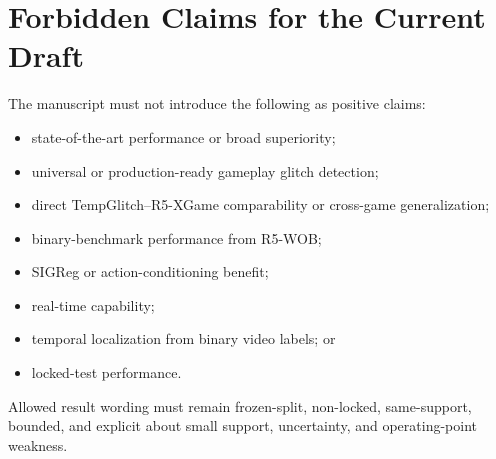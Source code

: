 \section{Forbidden Claims for the Current Draft}
\label{app:forbidden-claims}

The manuscript must not introduce the following as positive claims:
\begin{itemize}[leftmargin=*]
\item state-of-the-art performance or broad superiority;
\item universal or production-ready gameplay glitch detection;
\item direct TempGlitch--R5-XGame comparability or cross-game generalization;
\item binary-benchmark performance from R5-WOB;
\item SIGReg or action-conditioning benefit;
\item real-time capability;
\item temporal localization from binary video labels; or
\item locked-test performance.
\end{itemize}

Allowed result wording must remain frozen-split, non-locked, same-support, bounded, and explicit
about small support, uncertainty, and operating-point weakness.
